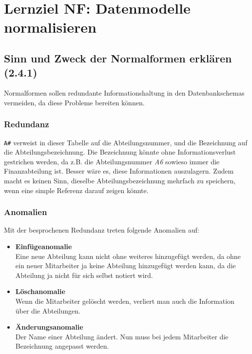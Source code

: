 \section{Lernziel NF: Datenmodelle normalisieren}

\subsection{Sinn und Zweck der Normalformen erklären (2.4.1)}
Normalformen sollen redundante Informationshaltung in den Datenbankschemas vermeiden, da diese Probleme bereiten können.

\subsubsection{Redundanz}


\texttt{A\#} verweist in dieser Tabelle auf die Abteilungsnummer, und die Bezeichnung auf die Abteilungsbezeichnung. Die Bezeichnung könnte ohne Informationsverlust gestrichen werden, da z.B. die Abteilungsnummer \textit{A6} sowieso immer die Finanzabteilung ist. Besser wäre es, diese Informationen auszulagern. Zudem macht es keinen Sinn, dieselbe Abteilungsbezeichnung mehrfach zu speichern, wenn eine simple Referenz darauf zeigen könnte.

\subsubsection{Anomalien}
Mit der besprochenen Redundanz treten folgende Anomalien auf:
\begin{itemize}
  \item \textbf{Einfügeanomalie} \\
  Eine neue Abteilung kann nicht ohne weiteres hinzugefügt werden, da ohne ein neuer Mitarbeiter ja keine Abteilung hinzugefügt werden kann, da die Abteilung ja nicht für sich selbst notiert wird.
  \item \textbf{Löschanomalie} \\
  Wenn die Mitarbeiter gelöscht werden, verliert man auch die Information über die Abteilungen.
  \item \textbf{Änderungsanomalie} \\
  Der Name einer Abteilung ändert. Nun muss bei jedem Mitarbeiter die Bezeichnung angepasst werden.
\end{itemize}

